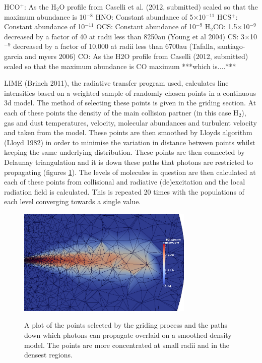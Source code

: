 \documentclass[useAMS,usenatbib]{mn2e}
\begin{document}
HCO$^+$: As the H$_2$O profile from Caselli et al. (2012, submitted) scaled so that the maximum abundance is 10$^{-8}$\newline
HNO: Constant abundance of 5$\times$10$^{-11}$\newline
HCS$^+$: Constant abundance of 10$^{-11}$\newline
OCS: Constant abundance of 10$^{-9}$\newline
H$_2$CO: 1.5$\times$10$^{-9}$ decreased by a factor of 40 at radii less than 8250au (Young et al 2004)\newline
CS:  3$\times$10$^{-9}$ decreased by a factor of 10,000 at radii less than 6700au (Tafalla, santiago-garcia and myers 2006)\newline
CO: As the H2O profile from Caselli (2012, submitted) scaled so that the maximum abundance is CO maximum ***which is....***\newline


LIME (Brinch 2011), the radiative transfer program used, calculates line intensities based on a weighted sample of randomly chosen points in a continuous 3d model. The method of selecting these points is given in the griding section. At each of these points the density of the main collision partner (in this case H$_2$), gas and dust temperatures, velocity, molecular abundances and turbulent velocity and taken from the model. These points are then smoothed by Lloyds algorithm (Lloyd 1982) in order to minimise the variation in distance between points whilst keeping the same underlying distribution. These points are then connected by Delaunay triangulation and it is down these paths that photons are restricted to propagating (figures \ref{grid}). The levels of molecules in question are then  calculated at each of these points from collisional and radiative (de)excitation and the local radiation field is calculated. This is repeated 20 times with the populations of each level converging towards a single value.\newline


\begin{figure}
 \includegraphics[width=84mm]{Figures/model/Lime_grid3.png}
 \label{grid}
 \caption{A plot of the points selected by the griding process and the paths down which photons can propagate overlaid on a smoothed density model. The points are more concentrated at small radii and in the densest regions.}
\end{figure}
\end{document}
